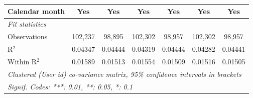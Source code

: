 \begin{table}[htbp]
\begin{threeparttable}[b]
\begin{tabular}{lcccccc}
         Calendar month                   & Yes                  & Yes                  & Yes                  & Yes                  & Yes                  & Yes\\  
         \midrule
         \emph{Fit statistics}\\
         Observations                     & 102,237              & 98,895               & 102,302              & 98,957               & 102,302              & 98,957\\  
         R$^2$                            & 0.04347              & 0.04444              & 0.04319              & 0.04444              & 0.04282              & 0.04441\\  
         Within R$^2$                     & 0.01589              & 0.01513              & 0.01554              & 0.01509              & 0.01516              & 0.01505\\  
         \midrule \midrule
         \multicolumn{7}{l}{\emph{Clustered (User id) co-variance matrix, 95\% confidence intervals in brackets}}\\
         \multicolumn{7}{l}{\emph{Signif. Codes: ***: 0.01, **: 0.05, *: 0.1}}\\
      \end{tabular}
   \end{threeparttable}
\end{table}


